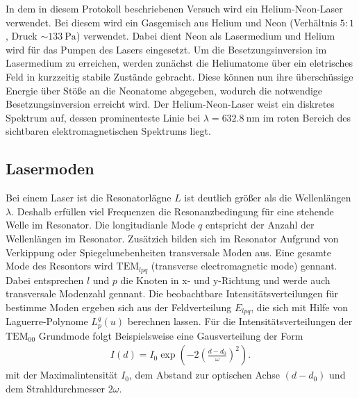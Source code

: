 In dem in diesem Protokoll beschriebenen
Versuch wird ein Helium-Neon-Laser verwendet.
Bei diesem wird ein Gasgemisch aus Helium und
Neon (Verhältnis $5:1$, Druck $\sim \SI{133}{\pascal}$) verwendet.
Dabei dient Neon als Lasermedium und Helium wird für das Pumpen
des Lasers eingesetzt. Um die Besetzungsinversion im Lasermedium
zu erreichen, werden zunächst die Heliumatome über ein
eletrisches Feld in kurzzeitig stabile Zustände gebracht.
Diese können nun ihre
überschüssige Energie über Stöße an die Neonatome abgegeben,
wodurch die notwendige Besetzungsinversion erreicht wird.
Der Helium-Neon-Laser weist ein diskretes Spektrum auf, dessen
prominenteste Linie bei $\lambda = \SI{632.8}{\nano\meter}$ im
roten Bereich des sichtbaren elektromagnetischen Spektrums liegt.






\subsection{Lasermoden}
\label{subsec:lasermoden}
Bei einem Laser ist die
Resonatorlägne $L$ ist deutlich größer
als die Wellenlängen $\lambda$. Deshalb erfüllen viel Frequenzen
die Resonanzbedingung für eine stehende Welle im Resonator.
Die longitudianle Mode $q$ entspricht der Anzahl der Wellenlängen
im Resonator. Zusätzich bilden sich im Resonator
Aufgrund von Verkippung oder Spiegelunebenheiten
transversale Moden aus.
Eine gesamte Mode des Resontors wird
$\text{TEM}_{lpq}$ (transverse electromagnetic mode)
gennant. Dabei entsprechen $l$ und $p$ die Knoten in
x- und y-Richtung und werde auch
transversale Modenzahl gennant.
Die beobachtbare Intensitätsverteilungen für bestimme Moden
ergeben sich aus der Feldverteilung $E_{lpq}$, die
sich mit Hilfe von Laguerre-Polynome $L_p^q(u)$
berechnen lassen. Für
die Intensitätsverteilungen der $\text{TEM}_{00}$ Grundmode folgt Beispielsweise
eine Gausverteilung der Form
\begin{align}
I(d)=I_0\exp\left(-2\left(\frac{d-d_0}{\omega}\right)^2\right). \label{eqn:TEM00}
\end{align}
mit der Maximalintensität $I_0$, dem Abstand zur optischen Achse $(d-d_0)$
und dem Strahldurchmesser $2\omega$.
